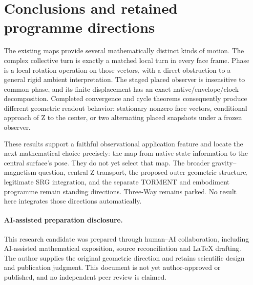\documentclass[11pt,a4paper]{article}
\numberwithin{equation}{section}
\theoremstyle{definition}
\theoremstyle{remark}
\begin{document}
\section{Conclusions and retained programme directions}

The existing maps provide several mathematically distinct kinds of motion.
The complex collective turn is exactly a matched local turn in every face
frame. Phase is a local rotation operation on those vectors, with a direct
obstruction to a general rigid ambient interpretation. The staged placed
observer is insensitive to common phase, and its finite displacement has
an exact native/envelope/clock decomposition. Completed convergence and
cycle theorems consequently produce different geometric readout behavior:
stationary nonzero face vectors, conditional approach of Z to the center,
or two alternating placed snapshots under a frozen observer.

These results support a faithful observational application feature and
locate the next mathematical choice precisely: the map from native state
information to the central surface's pose. They do not yet select that map.
The broader gravity--magnetism question, central Z transport, the proposed
outer geometric structure, legitimate SRG integration, and the separate
TORMENT and embodiment programme remain standing directions. Three-Way
remains parked. No result here integrates those directions automatically.

\paragraph{AI-assisted preparation disclosure.}
This research candidate was prepared through human--AI collaboration,
including AI-assisted mathematical exposition, source reconciliation and
LaTeX drafting. The author supplies the original geometric direction and
retains scientific design and publication judgment. This document is not
yet author-approved or published, and no independent peer review is claimed.
\end{document}
